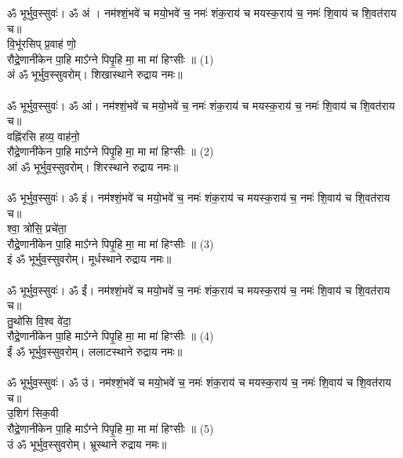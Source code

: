 \subsection{}\\
{\small ॐ भूर्भुव॒स्सुवः॑। ॐ अं । नम॑श्शं॒भवे॑ च मयो॒भवे॑ च॒ नमः॑ शंक॒राय॑ च मयस्क॒राय॑ च॒ नमः॑ शि॒वाय॑ च शि॒वत॑राय च॥}\\
वि॒भू॑रसिप् प्र॒वाह॑ णो॒\\
रौद्रे॒णानी॑केन पा॒हि माऽ᳚ग्ने पिपृ॒हि मा॒ मा मा॑ हिꣳसीः ॥ (1)\\
{\small अं ॐ भूर्भुव॒स्सुवरोम्। शिखास्थाने रुद्राय नमः॥}\\
\\
{\small ॐ भूर्भुव॒स्सुवः॑। ॐ आं। नम॑श्शं॒भवे॑ च मयो॒भवे॑ च॒ नमः॑ शंक॒राय॑ च मयस्क॒राय॑ च॒ नमः॑ शि॒वाय॑ च शि॒वत॑राय च॥}\\
वह्नि॑रसि हव्य॒ वाह॑नो॒\\
रौद्रे॒णानी॑केन पा॒हि माऽ᳚ग्ने पिपृ॒हि मा॒ मा मा॑ हिꣳसीः ॥ (2)\\
{\small आं ॐ भूर्भुव॒स्सुवरोम्। शिरस्थाने रुद्राय नमः॥}\\
\\
{\small ॐ भूर्भुव॒स्सुवः॑। ॐ इं। नम॑श्शं॒भवे॑ च मयो॒भवे॑ च॒ नमः॑ शंक॒राय॑ च मयस्क॒राय॑ च॒ नमः॑ शि॒वाय॑ च शि॒वत॑राय च॥}\\
श्वा॒ त्रो॑सि॒ प्रचे॑ता॒\\
रौद्रे॒णानी॑केन पा॒हि माऽ᳚ग्ने पिपृ॒हि मा॒ मा मा॑ हिꣳसीः ॥ (3)\\
{\small इं ॐ भूर्भुव॒स्सुवरोम्। मूर्धस्थाने रुद्राय नमः॥}\\
\\
{\small ॐ भूर्भुव॒स्सुवः॑। ॐ ईं। नम॑श्शं॒भवे॑ च मयो॒भवे॑ च॒ नमः॑ शंक॒राय॑ च मयस्क॒राय॑ च॒ नमः॑ शि॒वाय॑ च शि॒वत॑राय च॥}\\
तु॒थो॑सि वि॒श्व वे॑दा॒\\
रौद्रे॒णानी॑केन पा॒हि माऽ᳚ग्ने पिपृ॒हि मा॒ मा मा॑ हिꣳसीः ॥ (4)\\
{\small ईं ॐ भूर्भुव॒स्सुवरोम्। ललाटस्थाने रुद्राय नमः॥}\\
\\
{\small ॐ भूर्भुव॒स्सुवः॑। ॐ उं। नम॑श्शं॒भवे॑ च मयो॒भवे॑ च॒ नमः॑ शंक॒राय॑ च मयस्क॒राय॑ च॒ नमः॑ शि॒वाय॑ च शि॒वत॑राय च॥}\\
उ॒शिग॑ सिक॒वी\\
रौद्रे॒णानी॑केन पा॒हि माऽ᳚ग्ने पिपृ॒हि मा॒ मा मा॑ हिꣳसीः ॥  (5)\\
{\small उं ॐ भूर्भुव॒स्सुवरोम्। भ्रूस्थाने रुद्राय नमः॥}\\
\\
